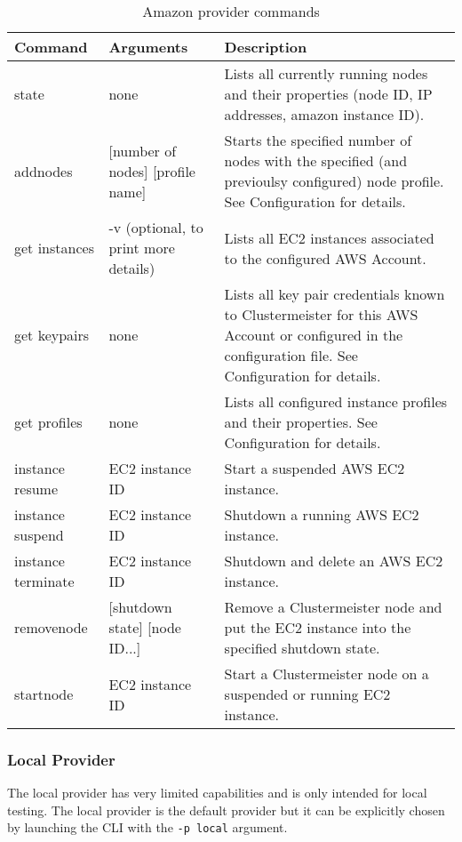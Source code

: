\documentclass{article}
\begin{document}
\begin{table}[h]
\centering
\begin{tabular}{|l| p{3cm} | p{6cm}|}
\hline
\textbf{Command} & \textbf{Arguments} & \textbf{Description} \\ \hline
state & none & Lists all currently running nodes and their properties (node ID, IP addresses, amazon instance ID). \\ \hline
addnodes & [number of nodes] [profile name] & Starts the specified number of nodes with the specified (and previoulsy configured) node profile. See Configuration for details. \\ \hline
get instances & -v (optional, to print more details) & Lists all EC2 instances associated to the configured AWS Account. \\ \hline
get keypairs & none & Lists all key pair credentials known to Clustermeister for this AWS Account or configured in the configuration file. See Configuration for details. \\ \hline
get profiles & none & Lists all configured instance profiles and their properties. See Configuration for details. \\ \hline
instance resume & EC2 instance ID & Start a suspended AWS EC2 instance. \\ \hline
instance suspend & EC2 instance ID & Shutdown a running AWS EC2 instance. \\ \hline
instance terminate & EC2 instance ID & Shutdown and delete an AWS EC2 instance. \\ \hline
removenode & [shutdown state] [node ID...] & Remove a Clustermeister node and put the EC2 instance into the specified shutdown state. \\ \hline
startnode & EC2 instance ID & Start a Clustermeister node on a suspended or running EC2 instance. \\ \hline
\end{tabular}
\caption{Amazon provider commands}
\label{tab:amazonprovider}
\end{table}


\subsubsection{Local Provider}

The local provider has very limited capabilities and is only intended for local testing. The local provider is the default provider but it can be explicitly chosen by launching the CLI with the \texttt{-p local} argument.
\end{document}
